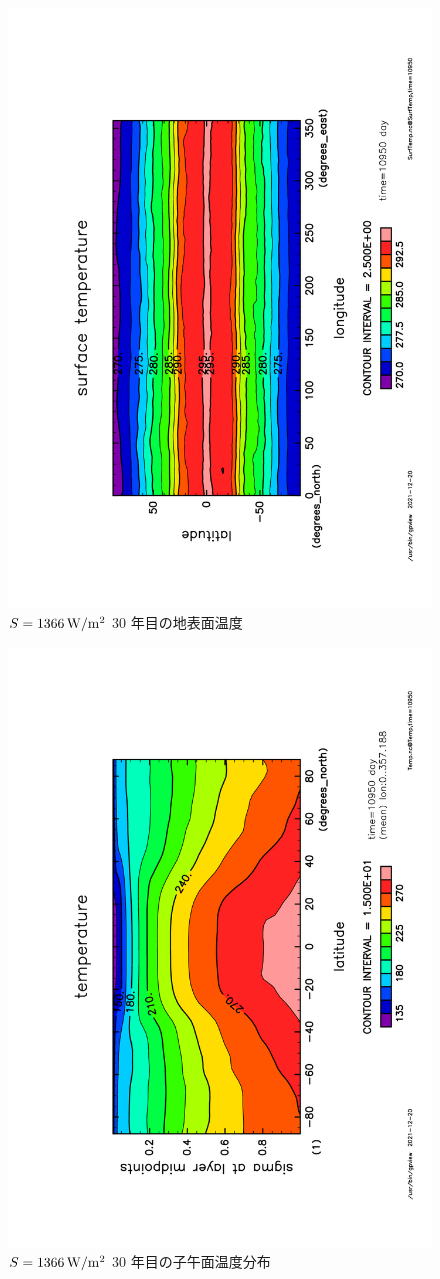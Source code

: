 \documentclass[body]{subfiles}
\begin{document}
\begin{figure}[t]
	\includegraphics[height=\textwidth,angle=-90]{S1366SurfTemp,time=10950.pdf}
	\caption{\(S=1366\hmu{W/m^2}\) 30 年目の地表面温度}
\end{figure}
\begin{figure}[t]
	\includegraphics[height=\textwidth,angle=-90]{S1366Temp,time=10950.pdf}
	\caption{\(S=1366\hmu{W/m^2}\) 30 年目の子午面温度分布}
\end{figure}
\end{document}
